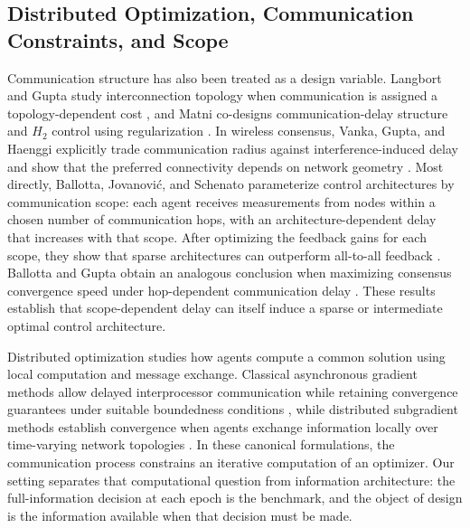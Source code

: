 \documentclass[11pt]{article}
\begin{document}
\subsection{Distributed Optimization, Communication Constraints, and Scope}
\label{subsec:related_distributed_control}

Communication structure has also been treated as a design variable. Langbort
and Gupta study interconnection topology when communication is assigned a
topology-dependent cost \cite{langbort2009minimal}, and Matni co-designs
communication-delay structure and $H_2$ control using regularization
\cite{matni2017communication}. In wireless consensus, Vanka, Gupta, and Haenggi
explicitly trade communication radius against interference-induced delay
and show that the preferred connectivity depends on network geometry
\cite{vanka2010power}. Most directly, Ballotta, Jovanovi\'c, and Schenato
parameterize control architectures by communication scope: each agent receives
measurements from nodes within a chosen number of communication hops, with an
architecture-dependent delay that increases with that scope. After optimizing
the feedback gains for each scope, they show that sparse architectures can
outperform all-to-all feedback \cite{ballotta2023latency}. Ballotta and Gupta
obtain an analogous conclusion when maximizing consensus convergence speed
under hop-dependent communication delay \cite{ballotta2023sparser}. These
results establish that scope-dependent delay can itself induce a sparse or
intermediate optimal control architecture.

Distributed optimization studies how agents compute a common solution using local computation and message exchange. Classical asynchronous gradient methods allow delayed interprocessor communication while retaining convergence guarantees under suitable boundedness conditions \cite{tsitsiklis1986distributed}, while distributed subgradient methods establish convergence when agents exchange information locally over time-varying network topologies \cite{nedic2009distributed}. In these canonical formulations, the communication process constrains an iterative computation of an optimizer. Our setting separates that computational question from information architecture: the full-information decision at each epoch is the benchmark, and the object of design is the information available when that decision must be made.
\end{document}
